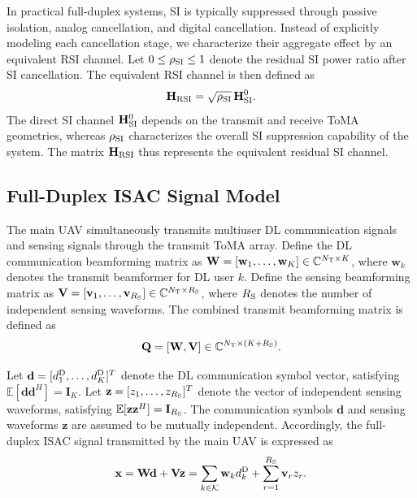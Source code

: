 \documentclass[letterpaper,journal]{IEEEtran}
\begin{document}
In practical full-duplex systems, SI is typically suppressed through passive isolation, analog cancellation, and digital cancellation. Instead of explicitly modeling each cancellation stage, we characterize their aggregate effect by an equivalent RSI channel. Let $0\le\rho_{\rm SI}\le1$ denote the residual SI power ratio after SI cancellation. The equivalent RSI channel is then defined as
\begin{equation}
\mathbf H_{\rm RSI}
=
\sqrt{\rho_{\rm SI}}\,
\mathbf H_{\rm SI}^{0}.
\label{eq:rsi_channel}
\end{equation}
The direct SI channel $\mathbf H_{\rm SI}^{0}$ depends on the transmit and receive ToMA geometries, whereas $\rho_{\rm SI}$ characterizes the overall SI suppression capability of the system. The matrix $\mathbf H_{\rm RSI}$ thus represents the equivalent residual SI channel.

\subsection{Full-Duplex ISAC Signal Model}
\label{subsec:signal_model}

The main UAV simultaneously transmits multiuser DL communication signals and sensing signals through the transmit ToMA array. Define the DL communication beamforming matrix as $\mathbf W=[\mathbf w_1,\ldots,\mathbf w_K]\in\mathbb C^{N_{\rm T}\times K}$, where $\mathbf w_k$ denotes the transmit beamformer for DL user $k$. Define the sensing beamforming matrix as $\mathbf V=[\mathbf v_1,\ldots,\mathbf v_{R_{\rm S}}]\in\mathbb C^{N_{\rm T}\times R_{\rm S}}$, where $R_{\rm S}$ denotes the number of independent sensing waveforms. The combined transmit beamforming matrix is defined as
\begin{equation}
\mathbf Q
=
[\mathbf W,\mathbf V]
\in
\mathbb C^{N_{\rm T}\times(K+R_{\rm S})}.
\label{eq:combined_beamforming}
\end{equation}

Let $\mathbf d=[d_1^{\rm D},\ldots,d_K^{\rm D}]^T$ denote the DL communication symbol vector, satisfying $\mathbb E[\mathbf d\mathbf d^H]=\mathbf I_K$. Let $\mathbf z=[z_1,\ldots,z_{R_{\rm S}}]^T$ denote the vector of independent sensing waveforms, satisfying $\mathbb E[\mathbf z\mathbf z^H]=\mathbf I_{R_{\rm S}}$. The communication symbols $\mathbf d$ and sensing waveforms $\mathbf z$ are assumed to be mutually independent. Accordingly, the full-duplex ISAC signal transmitted by the main UAV is expressed as
\begin{equation}
\mathbf x
=
\mathbf W\mathbf d+\mathbf V\mathbf z
=
\sum_{k\in\mathcal K}\mathbf w_kd_k^{\rm D}
+
\sum_{r=1}^{R_{\rm S}}\mathbf v_rz_r.
\label{eq:transmit_signal}
\end{equation}
\end{document}
